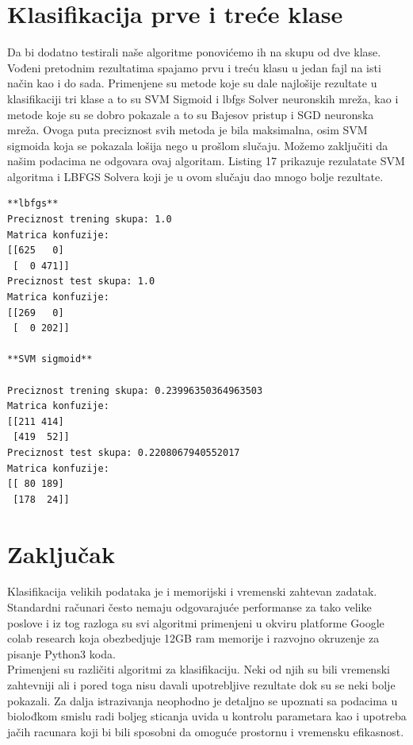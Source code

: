 \documentclass[14pt]{extarticle}
\begin{document}
\section{Klasifikacija prve i treće klase}
\label{sec:naslov1}
Da bi dodatno testirali naše algoritme ponovićemo ih na skupu od dve klase. Vođeni pretodnim rezultatima spajamo prvu i treću klasu u jedan fajl na isti način kao i do sada. Primenjene su metode koje su dale najlošije rezultate u klasifikaciji tri klase a to su SVM Sigmoid i lbfgs Solver neuronskih mreža, kao i metode koje su se dobro pokazale a to su Bajesov pristup i SGD neuronska mreža. Ovoga puta preciznost svih metoda  je bila maksimalna, osim SVM sigmoida koja se pokazala lošija nego u prošlom slučaju. Možemo zaključiti da našim podacima ne odgovara ovaj algoritam. Listing 17 prikazuje rezulatate SVM algoritma i LBFGS Solvera koji je u ovom slučaju dao mnogo bolje rezultate.

\begin{lstlisting}[caption={Rezultati klasifikacije dve klase},frame=single, label=simple]
**lbfgs**
Preciznost trening skupa: 1.0
Matrica konfuzije:
[[625   0]
 [  0 471]]
Preciznost test skupa: 1.0
Matrica konfuzije:
[[269   0]
 [  0 202]]

**SVM sigmoid**

Preciznost trening skupa: 0.23996350364963503
Matrica konfuzije:
[[211 414]
 [419  52]]
Preciznost test skupa: 0.2208067940552017
Matrica konfuzije:
[[ 80 189]
 [178  24]]

\end{lstlisting}



\section{Zaključak}
\label{sec:naslov1}
Klasifikacija velikih podataka je i memorijski i vremenski zahtevan zadatak. Standardni računari često nemaju odgovarajuće performanse za tako velike poslove i iz tog razloga su svi algoritmi primenjeni u okviru platforme Google colab research koja obezbedjuje 12GB ram memorije i razvojno okruzenje za pisanje Python3 koda.\\ Primenjeni su različiti algoritmi za klasifikaciju. Neki od njih su bili vremenski zahtevniji ali i pored toga nisu davali upotrebljive rezultate dok su se neki bolje pokazali. Za dalja istrazivanja neophodno je detaljno se upoznati sa podacima u biolođkom smislu radi boljeg sticanja uvida u kontrolu parametara kao i upotreba jačih racunara koji bi bili  sposobni da omoguće prostornu i vremensku efikasnost. \cite{c}


\appendix
 

\end{document}
